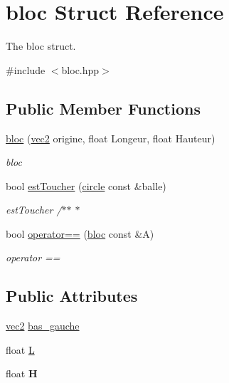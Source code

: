 \hypertarget{structbloc}{\section{bloc Struct Reference}
\label{structbloc}
}


The bloc struct.  




{\ttfamily \#include $<$bloc.\-hpp$>$}

\subsection*{Public Member Functions}
\begin{DoxyCompactItemize}
\item 
\hyperlink{structbloc_a2a5a4e418a9decebe5b7f30df71af385}{bloc} (\hyperlink{structvec2}{vec2} origine, float Longeur, float Hauteur)
\begin{DoxyCompactList}\small\item\em bloc \end{DoxyCompactList}\item 
bool \hyperlink{structbloc_a51aa6ddde5ddfec73ab1ac6004a1e09c}{est\-Toucher} (\hyperlink{structcircle}{circle} const \&balle)
\begin{DoxyCompactList}\small\item\em est\-Toucher /$\ast$$\ast$ $\ast$ \end{DoxyCompactList}\item 
bool \hyperlink{structbloc_a731b8b1d5fe6c1cf9e0edcc5c5cccc1b}{operator==} (\hyperlink{structbloc}{bloc} const \&A)
\begin{DoxyCompactList}\small\item\em operator == \end{DoxyCompactList}\end{DoxyCompactItemize}
\subsection*{Public Attributes}
\begin{DoxyCompactItemize}
\item 
\hyperlink{structvec2}{vec2} \hyperlink{structbloc_a66f43d85d906eae25ff2bd055704ec76}{bas\-\_\-gauche}
\item 
float \hyperlink{structbloc_a952b25540dde128110d4c1046656cb5e}{L}
\item 
\hypertarget{structbloc_a59981ef09d24dcf015f480c3e4318eef}{float {\bfseries H}}\label{structbloc_a59981ef09d24dcf015f480c3e4318eef}

\end{DoxyCompactItemize}


